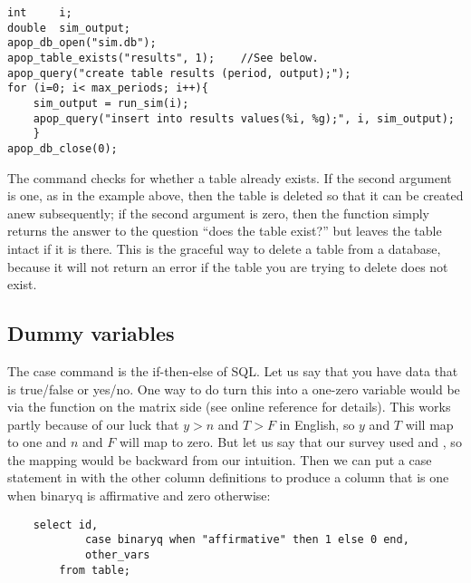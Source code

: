\begin{lstlisting}
int     i;
double  sim_output;
apop_db_open("sim.db");
apop_table_exists("results", 1);    //See below.
apop_query("create table results (period, output);");
for (i=0; i< max_periods; i++){
    sim_output = run_sim(i);
    apop_query("insert into results values(%i, %g);", i, sim_output);
    }
apop_db_close(0);
\end{lstlisting}

The  command checks for whether a table
already exists. If the second argument is one, as in the example above,
then the table is deleted so that it can be created anew subsequently;
if the second argument is zero, then the function simply returns the
answer to the question ``does the table exist?'' but leaves the table
intact if it is there. This is the graceful way to delete a table from
a database, because it will not return an error if the table you are
trying to delete does not exist.

\subsection{Dummy variables} 
The \si{case} command is the if-then-else of SQL. Let us say that you
have data that is true/false or yes/no. One way to do turn this into a
one-zero variable would be via
the  function on the matrix side
(see online reference for details). 
This works partly because of our
luck that $y > n$ and $T > F$ in English, so $y$ and $T$ will map to one
and $n$ and $F$ will map to zero. But let us say that our survey used
 and , so the mapping would be
backward from our intuition.  Then we can put a \si{case} statement in with the other
column definitions to produce a column that is one when
\si{binaryq} is affirmative and zero otherwise:
\begin{lstlisting}
    select id, 
            case binaryq when "affirmative" then 1 else 0 end, 
            other_vars
        from table;
\end{lstlisting}


